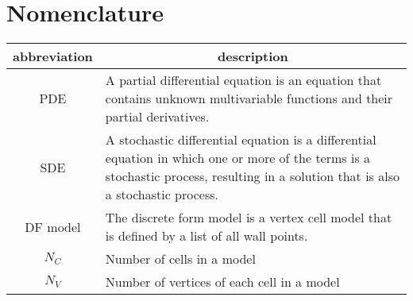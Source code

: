 \section*{Nomenclature}

\begin{table}[h!]
\centering
\begin{tabular}{c p{12cm}} %
\hline
\textbf{abbreviation} & \multicolumn{1}{c}{\textbf{description}}\\ 
\midrule
PDE &  A partial differential equation is an equation that contains unknown multivariable functions and their partial derivatives. \\
SDE &  A stochastic differential equation is a differential equation in which one or more of the terms is a stochastic process, resulting in a solution that is also a stochastic process. \\
DF model & The discrete form model is a vertex cell model that is defined by a list of all wall points. \\
$N_C$ & Number of cells in a model \\
$N_V$ & Number of vertices of each cell in a model \\
\bottomrule
\end{tabular}
\end{table}
